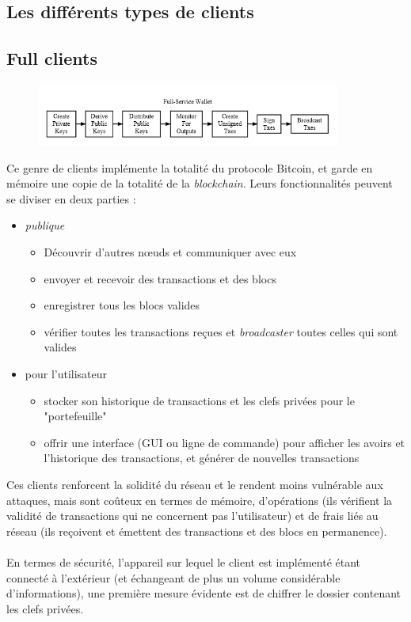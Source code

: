\documentclass[11pt,a4paper]{article}
\begin{document}
\subsection{Les différents types de clients}
\subsection{Full clients}
\begin{figure}[h]
	\centering
	\includegraphics[width=10cm]{en-wallets-full-service}
\end{figure}
Ce genre de clients implémente la totalité du protocole Bitcoin, et garde en mémoire une copie de la totalité de la \textit{blockchain}. Leurs fonctionnalités peuvent se diviser en deux parties :
\begin{itemize}
	\item \textit{publique}\begin{itemize}
		\item Découvrir d'autres n\oe{}uds et communiquer avec eux
		\item envoyer et recevoir des transactions et des blocs
		\item enregistrer tous les blocs valides
		\item vérifier toutes les transactions reçues et \textit{broadcaster} toutes celles qui sont valides
	\end{itemize}
	\item pour l'utilisateur \begin{itemize}
		\item stocker son historique de transactions et les clefs privées pour le "portefeuille"
		\item offrir une interface (GUI ou ligne de commande) pour afficher les avoirs et l'historique des transactions, et générer de nouvelles transactions
	\end{itemize}
\end{itemize}
Ces clients renforcent la solidité du réseau et le rendent moins vulnérable aux attaques, mais sont coûteux en termes de mémoire, d'opérations (ils vérifient la validité de transactions qui ne concernent pas l'utilisateur) et de frais liés au réseau (ils reçoivent et émettent des transactions et des blocs en permanence).\\\\
En termes de sécurité, l'appareil sur lequel le client est implémenté étant connecté à l'extérieur (et échangeant de plus un volume considérable d'informations), une première mesure évidente est de chiffrer le dossier contenant les clefs privées.
\end{document}
